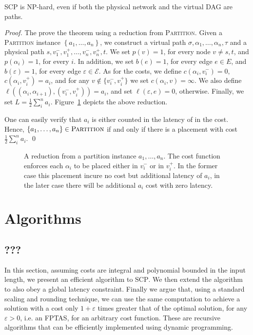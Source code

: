 \documentclass[runningheads]{llncs}
\newcommand{\set}[1]{\left\{ #1 \right\}}
\newcommand{\half}{\frac{1}{2}}
\newcommand{\eps}{\varepsilon}
\newcommand{\scp}{\textsc{SCP}\xspace}
\newcommand{\calE}{\mathcal{E}}
\begin{document}
\begin{theorem}
\scp is NP-hard, even if both the physical network and the virtual DAG
are paths.
\end{theorem}
\begin{proof}
The prove the theorem using a reduction from \textsc{Partition}.
Given a \textsc{Partition} instance $\set{a_1, \ldots, a_n}$, we
construct a virtual path $\sigma, \alpha_1, \ldots, \alpha_n, \tau$
and a physical path $s, v_1^-, v_1^+, \ldots, v_n^-, v_n^+, t$.  We
set $p(v) = 1$, for every node $v \neq s,t$, and $p(\alpha_i) = 1$,
for every $i$.  In addition, we set $b(e) = 1$, for every edge $e \in
E$, and $b(\eps) = 1$, for every edge $\eps \in \calE$.
%
As for the costs, we define $c(\alpha_i, v_i^-) = 0$, $c(\alpha_i,
v_i^+) = a_i$, and for any $v \notin \{v_i^-,v_i^+\}$ we set
$c(\alpha_i, v) = \infty$.  We also define $\ell((\alpha_i,\alpha_{i+1}),
(v_i^-,v_i^+)) = a_i$, and set $\ell(\eps,e) = 0$, otherwise.  Finally,
we set $L = \half \sum_i^n a_i$.
%
Figure~\ref{fig:reduction2} depicts the above reduction.

One can easily verify that $a_i$ is either counted in the latency of in the cost.
Hence, 
$\set{a_1, \ldots,
a_n} \in \textsc{Partition}$ if and only if there is a placement with
cost $\half \sum_i^n a_i$.
%
\qed
\end{proof}


\begin{figure}[t]
\centering
\scalebox{.9}{

}
\caption[]{
\label{fig:reduction2}
A reduction from a partition instance $a_1, \ldots, a_n$.
The cost function enforces each $\alpha_i$ to be placed either 
in $v_i^-$ or in $v_i^+$.
In the former case this placement incure no cost but additional latency of $a_i$,
in the later case there will be additional $a_i$ cost with zero latency.
}
\end{figure}



\section{Algorithms}
\label{sec:algorithms}


\subsection{???}

In this section, 
assuming costs are integral and polynomial bounded in the input length,
we present an efficient algorithm to \scp{}.
We then extend the algorithm to also obey a global latency constraint.
Finally we argue that, using a standard scaling and rounding technique, we can use
the same computation to achieve a solution with a cost only
$1 + \varepsilon$ times greater that of the optimal solution, for any
$\varepsilon > 0$, i.e. an FPTAS, for an arbitrary cost function.
These are recursive algorithms that can be efficiently implemented using
dynamic programming.
\end{document}
